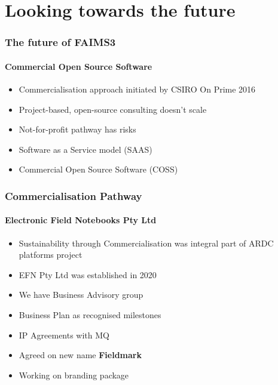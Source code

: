 \section{Looking towards the future}

\begin{sectionframe} %
	\frametitle{The future of FAIMS3}
	\framesubtitle{Commercial Open Source Software}

\begin{itemize}
    \item Commercialisation approach initiated by CSIRO On Prime 2016
    \item Project-based, open-source consulting doesn't scale
    \item Not-for-profit pathway has risks
    \item Software as a Service model (SAAS)
    \item Commercial Open Source Software (COSS)
        
\end{itemize}
\end{sectionframe}

\begin{frame} %
	\frametitle{Commercialisation Pathway}
	\framesubtitle{Electronic Field Notebooks Pty Ltd}

\begin{itemize}
   \item Sustainability through Commercialisation was integral part of ARDC platforms project
    \item EFN Pty Ltd was established in 2020
    \item We have Business Advisory group
    \item Business Plan as recognised milestones
    \item IP Agreements with MQ
    \item Agreed on new name \textbf{Fieldmark} 
    \item Working on branding package
\end{itemize}
\end{frame}


